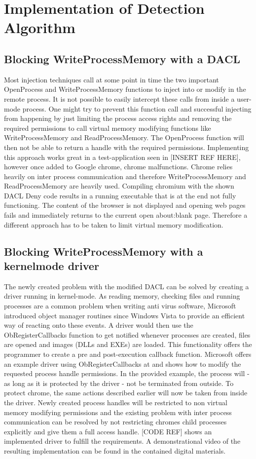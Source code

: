 \section{Implementation of Detection Algorithm}
\subsection{Blocking WriteProcessMemory with a DACL}
\label{sec:implementation_dacl}
Most injection techniques call at some point in time the two important OpenProcess and WriteProcessMemory functions to inject into or modify in the remote process. It is not possible to easily intercept these calls from inside a user-mode process. One might try to prevent this function call and successful injecting from happening by just limiting the process access rights and removing the required permissions to call virtual memory modifying functions like WriteProcessMemory and ReadProcessMemory. The OpenProcess function will then not be able to return a handle with the required permissions. Implementing this approach works great in a test-application seen in [INSERT REF HERE], however once added to Google chrome, chrome malfunctions. Chrome relies heavily on inter process communication and therefore WriteProcessMemory and ReadProcessMemory are heavily used. Compiling chromium with the shown DACL Deny code results in a running executable that is at the end not fully functioning. The content of the browser is not displayed and opening web pages fails and immediately returns to the current open about:blank page. Therefore a different approach has to be taken to limit virtual memory modification.

\subsection{Blocking WriteProcessMemory with a kernelmode driver}
The newly created problem with the modified DACL can be solved by creating a driver running in kernel-mode. As reading memory, checking files and running processes are a common problem when writing anti virus software, Microsoft introduced object manager routines since Windows Vista to provide an efficient way of reacting onto these events. A driver would then use the ObRegisterCallbacks function to get notified whenever processes are created, files are opened and images (DLLs and EXEs) are loaded. This functionality offers the programmer to create a pre and post-execution callback function. Microsoft offers an example driver using ObRegisterCallbacks at \cite{github_obcallback} and shows how to modify the requested process handle permissions. In the provided example, the process will - as long as it is protected by the driver - not be terminated from outside. To protect chrome, the same actions described earlier will now be taken from inside the driver. Newly created process handles will be restricted to non virtual memory modifying permissions and the existing problem with inter process communication can be resolved by not restricting chromes child processes explicitly and give them a full access handle. [CODE REF] shows an implemented driver to fulfill the requirements. A demonstrational video of the resulting implementation can be found in the contained digital materials.

